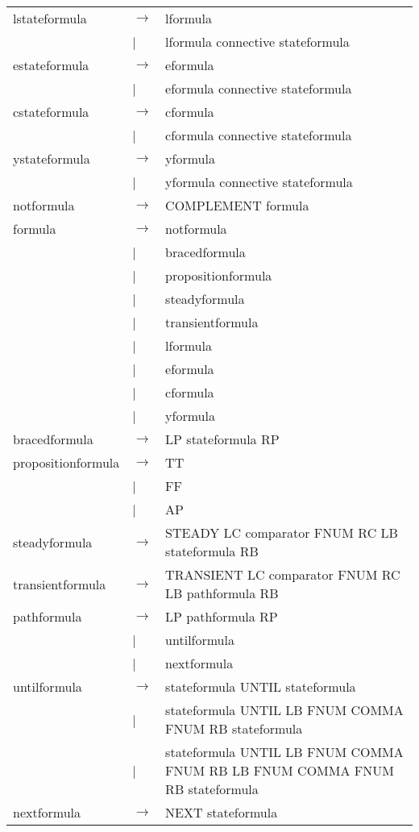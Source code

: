 \begin{table}[!ht]
\begin{center}
\begin{tiny}
\begin{tabular}{||lll||}
\hline lstateformula & $\longrightarrow$ & lformula \\
& | & lformula connective stateformula \\
\hline estateformula & $\longrightarrow$ & eformula \\
& | & eformula connective stateformula \\
\hline cstateformula & $\longrightarrow$ & cformula \\
& | & cformula connective stateformula \\
\hline ystateformula & $\longrightarrow$ & yformula \\
& | & yformula connective stateformula \\
\hline notformula & $\longrightarrow$ & COMPLEMENT formula \\
\hline formula & $\longrightarrow$ & notformula \\
& | & bracedformula \\
& | & propositionformula \\
& | & steadyformula \\
& | & transientformula \\
& | & lformula \\
& | & eformula \\
& | & cformula \\
& | & yformula \\
\hline bracedformula & $\longrightarrow$ & LP stateformula RP \\
\hline propositionformula & $\longrightarrow$ & TT \\
& | & FF \\
& | & AP \\
\hline steadyformula & $\longrightarrow$ & STEADY LC comparator FNUM RC LB stateformula RB \\
\hline transientformula & $\longrightarrow$ & TRANSIENT LC comparator FNUM RC LB pathformula RB \\
\hline pathformula & $\longrightarrow$ & LP pathformula RP \\
& | & untilformula \\
& | & nextformula \\
\hline untilformula & $\longrightarrow$ & stateformula UNTIL stateformula \\
& | & stateformula UNTIL LB FNUM COMMA FNUM RB stateformula \\
& | & stateformula UNTIL LB FNUM COMMA FNUM RB LB FNUM COMMA FNUM RB stateformula \\
\hline nextformula & $\longrightarrow$ & NEXT stateformula \\

\end{tabular}
\end{tiny}
\end{center}
\end{table}
